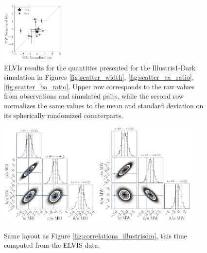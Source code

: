\documentclass[a4paper,fleqn,usenatbib]{mnras}
\begin{document}
\begin{figure}
\includegraphics[width=0.28\textwidth]{scatter_norm_ranked_elvis_ba_ratio.pdf}
\caption{ELVIs results for the quantities presented for the Illustris1-Dark
  simulation in Figures  \ref{fig:scatter_width},
  \ref{fig:scatter_ca_ratio}, \ref{fig:scatter_ba_ratio}.
Upper row corresponds to the raw values from observations and
simulated pairs, while the second row normalizes the same values to
the mean and standard deviation on its spherically randomized
counterparts. 
\label{fig:scatter_elvis}}
\end{figure}

\begin{figure}
\centering
\includegraphics[width=0.45\textwidth]{gaussian_model_elvis_M31.pdf}
\includegraphics[width=0.45\textwidth]{gaussian_model_elvis_MW.pdf}
\caption{
Same layout as Figure \ref{fig:correlations_illustrisdm}, this time
computed from the ELVIS data.
\label{fig:correlations_elvis}}
\end{figure}
\end{document}
